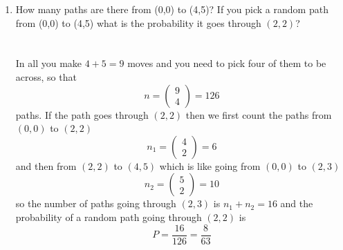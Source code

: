 \documentclass[11pt,a4paper]{scrartcl}
\begin{document}
\begin{enumerate}

\item How many paths are there from (0,0) to (4,5)? If you pick a random path from (0,0) to (4,5) what is the probability it goes through $(2,2)$?\\ \\ \\
  In all you make $4+5=9$ moves and you need to pick four of them to be across, so that
  \begin{equation}
    n=\left(\begin{array}{c}9\\4\end{array}\right)=126
  \end{equation}
  paths. If the path goes through $(2,2)$ then we first count the paths from $(0,0)$ to $(2,2)$
  \begin{equation}
    n_1=\left(\begin{array}{c}4\\2\end{array}\right)=6
  \end{equation}
  and then from $(2,2)$ to $(4,5)$ which is like going from $(0,0)$ to $(2,3)$
  \begin{equation}
    n_2=\left(\begin{array}{c}5\\2\end{array}\right)=10
  \end{equation}
  so the number of paths going through $(2,3)$ is $n_1+n_2=16$ and the probability of a random path going through $(2,2)$ is
  \begin{equation}
    P=\frac{16}{126}=\frac{8}{63}
  \end{equation}
    

\end{enumerate}
\end{document}
